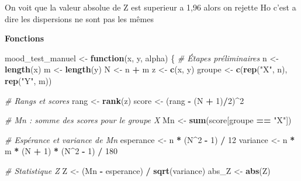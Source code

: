 \documentclass[
  12pt,
]{article}
\newenvironment{Shaded}{\begin{snugshade}}{\end{snugshade}}
\newcommand{\CommentTok}[1]{\textcolor[rgb]{0.56,0.35,0.01}{\textit{#1}}}
\newcommand{\ControlFlowTok}[1]{\textcolor[rgb]{0.13,0.29,0.53}{\textbf{#1}}}
\newcommand{\DecValTok}[1]{\textcolor[rgb]{0.00,0.00,0.81}{#1}}
\newcommand{\FunctionTok}[1]{\textcolor[rgb]{0.13,0.29,0.53}{\textbf{#1}}}
\newcommand{\NormalTok}[1]{#1}
\newcommand{\OtherTok}[1]{\textcolor[rgb]{0.56,0.35,0.01}{#1}}
\newcommand{\SpecialCharTok}[1]{\textcolor[rgb]{0.81,0.36,0.00}{\textbf{#1}}}
\newcommand{\StringTok}[1]{\textcolor[rgb]{0.31,0.60,0.02}{#1}}
\begin{document}
On voit que la valeur absolue de Z est superieur a 1,96 alors on rejette
Ho c'est a dire les dispersions ne sont pas les mêmes

\textbf{Fonctions}

\begin{Shaded}
\begin{Highlighting}[]
\NormalTok{mood\_test\_manuel }\OtherTok{\textless{}{-}} \ControlFlowTok{function}\NormalTok{(x, y, alpha) \{}
  \CommentTok{\# Étapes préliminaires}
\NormalTok{  n }\OtherTok{\textless{}{-}} \FunctionTok{length}\NormalTok{(x)}
\NormalTok{  m }\OtherTok{\textless{}{-}} \FunctionTok{length}\NormalTok{(y)}
\NormalTok{  N }\OtherTok{\textless{}{-}}\NormalTok{ n }\SpecialCharTok{+}\NormalTok{ m}
\NormalTok{  z }\OtherTok{\textless{}{-}} \FunctionTok{c}\NormalTok{(x, y)}
\NormalTok{  groupe }\OtherTok{\textless{}{-}} \FunctionTok{c}\NormalTok{(}\FunctionTok{rep}\NormalTok{(}\StringTok{"X"}\NormalTok{, n), }\FunctionTok{rep}\NormalTok{(}\StringTok{"Y"}\NormalTok{, m))}
  
  \CommentTok{\# Rangs et scores}
\NormalTok{  rang }\OtherTok{\textless{}{-}} \FunctionTok{rank}\NormalTok{(z)}
\NormalTok{  score }\OtherTok{\textless{}{-}}\NormalTok{ (rang }\SpecialCharTok{{-}}\NormalTok{ (N }\SpecialCharTok{+} \DecValTok{1}\NormalTok{)}\SpecialCharTok{/}\DecValTok{2}\NormalTok{)}\SpecialCharTok{\^{}}\DecValTok{2}
  
  \CommentTok{\# Mn : somme des scores pour le groupe X}
\NormalTok{  Mn }\OtherTok{\textless{}{-}} \FunctionTok{sum}\NormalTok{(score[groupe }\SpecialCharTok{==} \StringTok{"X"}\NormalTok{])}
  
  \CommentTok{\# Espérance et variance de Mn}
\NormalTok{  esperance }\OtherTok{\textless{}{-}}\NormalTok{ n }\SpecialCharTok{*}\NormalTok{ (N}\SpecialCharTok{\^{}}\DecValTok{2} \SpecialCharTok{{-}} \DecValTok{1}\NormalTok{) }\SpecialCharTok{/} \DecValTok{12}
\NormalTok{  variance }\OtherTok{\textless{}{-}}\NormalTok{ n }\SpecialCharTok{*}\NormalTok{ m }\SpecialCharTok{*}\NormalTok{ (N }\SpecialCharTok{+} \DecValTok{1}\NormalTok{) }\SpecialCharTok{*}\NormalTok{ (N}\SpecialCharTok{\^{}}\DecValTok{2} \SpecialCharTok{{-}} \DecValTok{1}\NormalTok{) }\SpecialCharTok{/} \DecValTok{180}
  
  \CommentTok{\# Statistique Z}
\NormalTok{  Z }\OtherTok{\textless{}{-}}\NormalTok{ (Mn }\SpecialCharTok{{-}}\NormalTok{ esperance) }\SpecialCharTok{/} \FunctionTok{sqrt}\NormalTok{(variance)}
\NormalTok{  abs\_Z }\OtherTok{\textless{}{-}} \FunctionTok{abs}\NormalTok{(Z)}
  

\end{Highlighting}
\end{Shaded}
\end{document}
